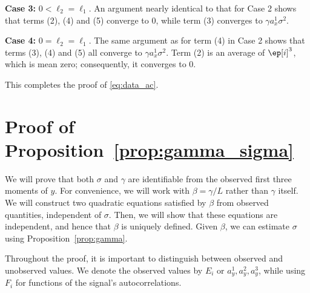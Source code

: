 \documentclass[9pt,twocolumn,twoside,lineno]{pnas-new}
\begin{document}
{\bf Case 3:} $0<\ell_2 = \ell_1$. An argument nearly identical to that for Case 2 shows that terms (2), (4) and (5) converge to 0, while term (3) converges to $\gamma a_x^1 \sigma^2$.

{\bf Case 4:} $0=\ell_2 = \ell_1$. The same argument as for term (4) in Case 2 shows that terms (3), (4) and (5) all converge to $\gamma a_x^1 \sigma^2$. Term (2) is an average of $\ep[i]^3$, which is mean zero; consequently, it converges to 0.

This completes the proof of \eqref{eq:data_ac}.


\section{Proof of Proposition~\ref{prop:gamma_sigma}} \label{sec:proof_prop_gamma_sigma}

We will prove that both $\sigma$ and $\gamma$ are identifiable from the observed first three moments of $y$. For convenience, we will work with $\beta = \gamma / L$ rather than $\gamma$ itself. We will construct two quadratic equations satisfied by $\beta$ from observed quantities, independent of $\sigma$. Then, we will show that these equations are independent, and hence that $\beta$ is uniquely defined.  Given $\beta$, we can estimate $\sigma$ using Proposition~\ref{prop:gamma}.

Throughout the proof, it is important to distinguish between observed and unobserved values. 
We denote the observed values by $E_i$ or $a_y^1,a_y^2,a_y^3$, while using $F_i$ for functions of the signal's autocorrelations. 
\end{document}
